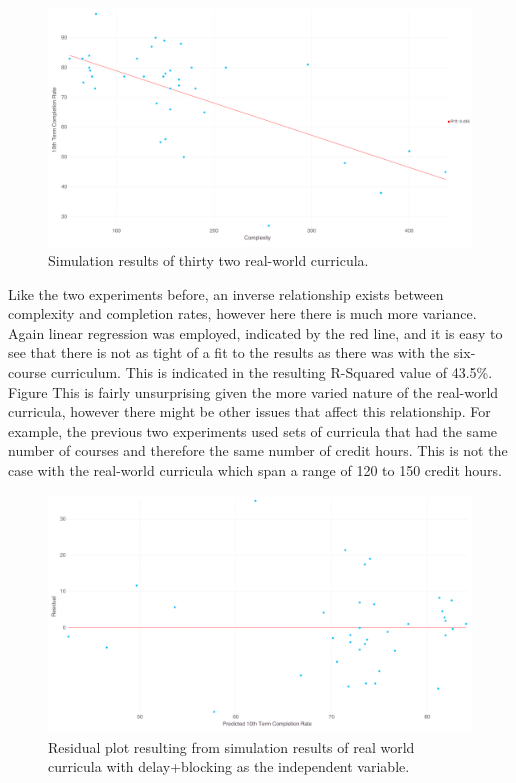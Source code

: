 \documentclass[botnum, fleqn]{unmeethesis}
\begin{document}
    \begin{figure}[h!]
      \centerline{\includegraphics[scale=0.25]{./figures/gradRate10_v_complexity_80.png}}
      \caption{Simulation results of thirty two real-world curricula.} 
      \label{fig:web10}
    \end{figure}

    Like the two experiments before, an inverse relationship exists between complexity and completion rates, however here there is much more variance. Again linear regression was employed, indicated by the red line, and it is easy to see that there is not as tight of a fit to the results as there was with the six-course curriculum. This is indicated in the resulting R-Squared value of 43.5\%. Figure  This is fairly unsurprising given the more varied nature of the real-world curricula, however there might be other issues that affect this relationship. For example, the previous two experiments used sets of curricula that had the same number of courses and therefore the same number of credit hours. This is not the case with the real-world curricula which span a range of 120 to 150 credit hours. 

    \begin{figure}[h!]
      \centerline{\includegraphics[scale=0.25]{./figures/complexity_80_residual.png}}
      \caption{Residual plot resulting from simulation results of real world curricula with delay+blocking as the independent variable.} 
      \label{fig:bestfit}
    \end{figure}
\end{document}
